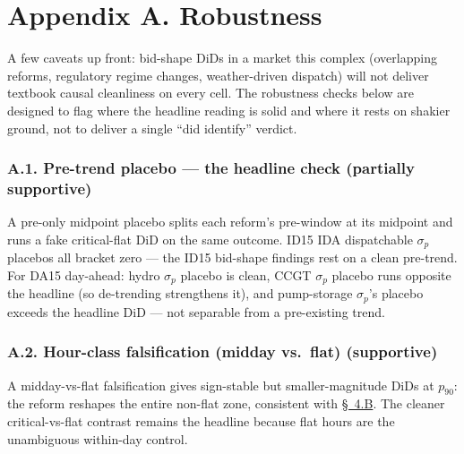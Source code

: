 \documentclass[11pt]{article}
\begin{document}
\newpage

\appendix

\section*{Appendix A. Robustness}
\label{sec:robustness}

A few caveats up front: bid-shape DiDs in a market this complex (overlapping reforms, regulatory regime changes, weather-driven dispatch) will not deliver textbook causal cleanliness on every cell. The robustness checks below are designed to flag where the headline reading is solid and where it rests on shakier ground, not to deliver a single ``did identify'' verdict.

\subsubsection*{A.1. Pre-trend placebo --- the headline check \textnormal{(partially supportive)}}\label{sec:5b}
A pre-only midpoint placebo splits each reform's pre-window at its midpoint and runs a fake critical-flat DiD on the same outcome. ID15 IDA dispatchable $\sigma_p$ placebos all bracket zero --- the ID15 bid-shape findings rest on a clean pre-trend. For DA15 day-ahead: hydro $\sigma_p$ placebo is clean, CCGT $\sigma_p$ placebo runs opposite the headline (so de-trending strengthens it), and pump-storage $\sigma_p$'s placebo exceeds the headline DiD --- not separable from a pre-existing trend.

\subsubsection*{A.2. Hour-class falsification (midday vs.\ flat) \textnormal{(supportive)}}\label{sec:5a}
A midday-vs-flat falsification gives sign-stable but smaller-magnitude DiDs at $p_{90}$: the reform reshapes the entire non-flat zone, consistent with \hyperref[sec:4-specB]{\S~4.B}. The cleaner critical-vs-flat contrast remains the headline because flat hours are the unambiguous within-day control.
\end{document}
